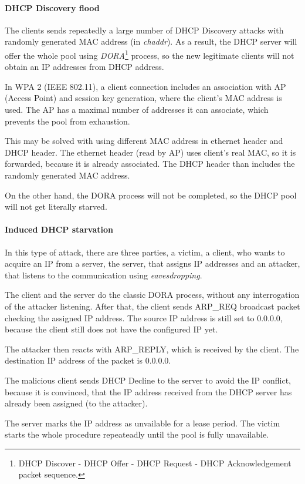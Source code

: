 \documentclass[10pt,a4paper,titlepage]{article}
\begin{document}
\paragraph{DHCP Discovery flood}
The clients sends repeatedly a large number of DHCP Discovery attacks with 
randomly generated MAC address (in {\it chaddr}). As a result, the DHCP server will
offer the whole pool using {\it DORA}\footnote{DHCP Discover - DHCP Offer - DHCP
Request - DHCP Acknowledgement packet sequence.} process, so the new legitimate
clients will not obtain an IP addresses from DHCP address.

In WPA 2 (IEEE 802.11), a client connection includes an association with AP
(Access Point) and session key generation, where the client's MAC address is used.
The AP has a maximal number of addresses it can associate, which prevents
the pool from exhaustion.

This may be solved with using different MAC address in ethernet header and
DHCP header. The ethernet header (read by AP) uses client's real MAC, so
it is forwarded, because it is already associated. The DHCP header than includes
the randomly generated MAC address.

On the other hand, the DORA process will not be completed, so the DHCP pool
will not get literally starved. 

\paragraph{Induced DHCP starvation}
In this type of attack, there are three parties, a victim, a client, who wants to
acquire an IP from a server, the server, that assigns IP addresses and an
attacker, that listens to the communication using {\it eavesdropping}. 

The client and the server do the classic DORA process, without any interrogation
of the attacker listening. After that, the client sends ARP\_REQ broadcast packet
checking the assigned IP address. The source IP address is still set to 0.0.0.0,
because the client still does not have the configured IP yet.

The attacker then reacts with ARP\_REPLY, which is received by the client.
The destination IP address of the packet is 0.0.0.0.

The malicious client sends DHCP Decline to the server to avoid the IP conflict,
because it is convinced, that the IP address received from the DHCP server
has already been assigned (to the attacker).

The server marks the IP address as unvailable for a lease period. The victim starts
the whole procedure repeateadly until the pool is fully unavailable.
\cite{IBSattack} \cite{DHCPstarvation}
\end{document}
